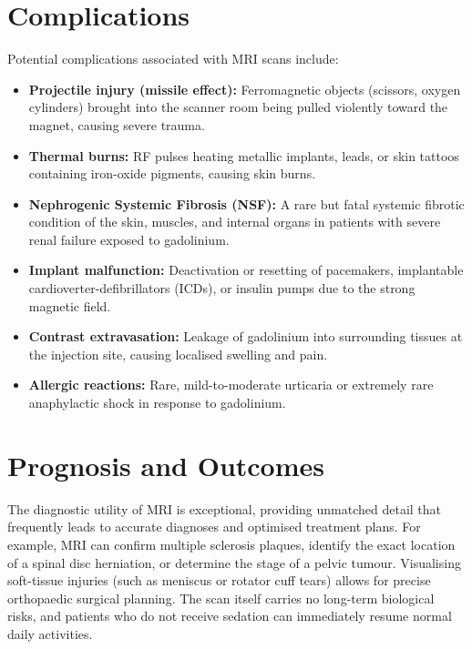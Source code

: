 \section*{Complications}
Potential complications associated with MRI scans include:
\begin{itemize}
    \item \textbf{Projectile injury (missile effect):} Ferromagnetic objects (scissors, oxygen cylinders) brought into the scanner room being pulled violently toward the magnet, causing severe trauma.
    \item \textbf{Thermal burns:} RF pulses heating metallic implants, leads, or skin tattoos containing iron-oxide pigments, causing skin burns.
    \item \textbf{Nephrogenic Systemic Fibrosis (NSF):} A rare but fatal systemic fibrotic condition of the skin, muscles, and internal organs in patients with severe renal failure exposed to gadolinium.
    \item \textbf{Implant malfunction:} Deactivation or resetting of pacemakers, implantable cardioverter-defibrillators (ICDs), or insulin pumps due to the strong magnetic field.
    \item \textbf{Contrast extravasation:} Leakage of gadolinium into surrounding tissues at the injection site, causing localised swelling and pain.
    \item \textbf{Allergic reactions:} Rare, mild-to-moderate urticaria or extremely rare anaphylactic shock in response to gadolinium.
\end{itemize}

\section*{Prognosis and Outcomes}
The diagnostic utility of MRI is exceptional, providing unmatched detail that frequently leads to accurate diagnoses and optimised treatment plans. For example, MRI can confirm multiple sclerosis plaques, identify the exact location of a spinal disc herniation, or determine the stage of a pelvic tumour. Visualising soft-tissue injuries (such as meniscus or rotator cuff tears) allows for precise orthopaedic surgical planning. The scan itself carries no long-term biological risks, and patients who do not receive sedation can immediately resume normal daily activities.


